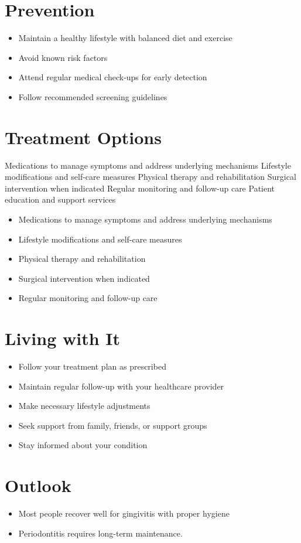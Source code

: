 \section{Prevention}
\begin{itemize}[noitemsep]
  \item Maintain a healthy lifestyle with balanced diet and exercise
  \item Avoid known risk factors
  \item Attend regular medical check-ups for early detection
  \item Follow recommended screening guidelines
\end{itemize}
\section{Treatment Options}
Medications to manage symptoms and address underlying mechanisms Lifestyle modifications and self-care measures Physical therapy and rehabilitation Surgical intervention when indicated Regular monitoring and follow-up care Patient education and support services

\begin{itemize}[noitemsep]
  \item Medications to manage symptoms and address underlying mechanisms
  \item Lifestyle modifications and self-care measures
  \item Physical therapy and rehabilitation
  \item Surgical intervention when indicated
  \item Regular monitoring and follow-up care
\end{itemize}
\section{Living with It}
\begin{itemize}[noitemsep]
  \item Follow your treatment plan as prescribed
  \item Maintain regular follow-up with your healthcare provider
  \item Make necessary lifestyle adjustments
  \item Seek support from family, friends, or support groups
  \item Stay informed about your condition
\end{itemize}
\section{Outlook}
\begin{itemize}[noitemsep]
  \item Most people recover well for gingivitis with proper hygiene
  \item Periodontitis requires long-term maintenance.
\end{itemize}
